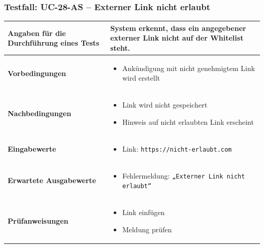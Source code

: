 \documentclass[a4paper,12pt]{article}
\begin{document}
\vspace{1.5cm}



\subsubsection{Testfall: UC-28-AS – Externer Link nicht erlaubt}
\vspace{0.5cm}

\begin{center}
\begin{tabular}{|p{5cm}|p{10.5cm}|}
\hline
\textbf{Angaben für die Durchführung eines Tests} & 
System erkennt, dass ein angegebener externer Link nicht auf der Whitelist steht. \\
\hline
\textbf{Vorbedingungen} &
\begin{minipage}[t]{10.5cm}
\begin{itemize}[leftmargin=*]
  \item Ankündigung mit nicht genehmigtem Link wird erstellt
\end{itemize}
\end{minipage} \\
\hline
\textbf{Nachbedingungen} &
\begin{minipage}[t]{10.5cm}
\begin{itemize}[leftmargin=*]
  \item Link wird nicht gespeichert
  \item Hinweis auf nicht erlaubten Link erscheint
\end{itemize}
\end{minipage} \\
\hline
\textbf{Eingabewerte} & 
\begin{minipage}[t]{10.5cm}
\begin{itemize}[leftmargin=*]
  \item Link: \texttt{https://nicht-erlaubt.com}
\end{itemize}
\end{minipage} \\
\hline
\textbf{Erwartete Ausgabewerte} &
\begin{minipage}[t]{10.5cm}
\begin{itemize}[leftmargin=*]
  \item Fehlermeldung: \texttt{„Externer Link nicht erlaubt“}
\end{itemize}
\end{minipage} \\
\hline
\textbf{Prüfanweisungen} &
\begin{minipage}[t]{10.5cm}
\begin{itemize}[leftmargin=*]
  \item Link einfügen
  \item Meldung prüfen
\end{itemize}
\end{minipage} \\
\hline
\end{tabular}
\end{center}
\end{document}
